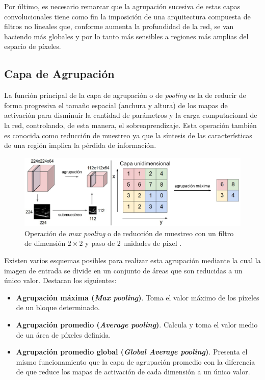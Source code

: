 Por último, es necesario remarcar que la agrupación sucesiva de estas capas convolucionales tiene como fin la imposición de una arquitectura compuesta de filtros no lineales que, conforme aumenta la profundidad de la red, se van haciendo más globales y por lo tanto más sensibles a regiones más amplias del espacio de píxeles.

\subsection{Capa de Agrupación}

La función principal de la capa de agrupación o de \textit{pooling} es la de reducir de forma progresiva el tamaño espacial (anchura y altura) de los mapas de activación para disminuir la cantidad de parámetros y la carga computacional de la red, controlando, de esta manera, el sobreaprendizaje. Esta operación también es conocida como reducción de muestreo ya que la síntesis de las características de una región implica la pérdida de información.

\begin{figure}
    \centering
    \includegraphics[width=\textwidth]{Images/Pooling.png}
    \caption{Operación de \textit{max pooling} o de reducción de muestreo con un filtro de dimensión $2\times 2$ y paso de 2 unidades de píxel \cite{CS231n}.}
    \label{fig:Pooling}
\end{figure}

Existen varios esquemas posibles para realizar esta agrupación mediante la cual la imagen de entrada se divide en un conjunto de áreas que son reducidas a un único valor. Destacan los siguientes:
\begin{itemize}
  \item \textbf{Agrupación máxima (\textit{Max pooling})}. Toma el valor máximo de los píxeles de un bloque determinado.
  \item \textbf{Agrupación promedio (\textit{Average pooling})}. Calcula y toma el valor medio de un área de píxeles definida.
  \item \textbf{Agrupación promedio global (\textit{Global Average pooling})}. Presenta el mismo funcionamiento que la capa de agrupación promedio con la diferencia de que reduce los mapas de activación de cada dimensión a un único valor. 
\end{itemize}


